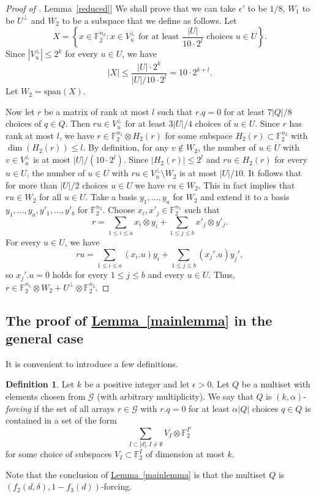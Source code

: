 \documentclass[11pt]{article}
\numberwithin{equation}{section}
\theoremstyle{definition}
\newtheorem{definition}[theorem]{Definition}
\theoremstyle{plain}
\newcommand{\expref}[2]{\hyperref[#2]{#1~\ref{#2}}}
\newcommand\eps{\epsilon}  %
\newcommand\F{\mathbb{F}}
\renewcommand\a{\alpha}
\renewcommand\d{\delta}
\newcommand \cG{\mathcal G}
\newcommand \s{\subset}
\begin{document}
\begin{proof}[Proof of \expref{Lemma}{reduced}]
  We shall prove that we can take $\eps'$ to be $1/8$, $W_1$ to be $U^{\perp}$ and $W_2$ to be a subspace that we define as follows. Let
  \[
    X=\left\{x\in \F_2^{n_2}: x\in V_u^{\perp} \text{ for at least } \frac{|U|}{10\cdot 2^{l}} \text{ choices } u\in U\right\}.
  \]
  Since $|V_u^{\perp}|\leq 2^k$ for every $u\in U$, we have
  \[
    |X|\leq \frac{|U|\cdot 2^k}{{|U|}/{10\cdot 2^l}}=10\cdot
    2^{k+l}.
  \]
  Let $W_2=\text{span}(X)$.
	
  Now let $r$ be a matrix of rank at most $l$ such that $r.q=0$ for at least $7|Q|/8$ choices of $q\in Q$. Then $ru\in V_u^{\perp}$ for at least $3|U|/4$ choices of $u\in U$. Since $r$ has rank at most $l$, we have $r\in \mathbb{F}_2^{n_1}\otimes H_2(r)$ for some subspace $H_2(r)\s \F_2^{n_2}$ with $\dim(H_2(r))\leq l$. By definition, for any $v\not \in W_2$, the number of $u\in U$ with $v\in V_u^{\perp}$ is at most ${|U|}/{(10\cdot 2^l)}$. Since $|H_2(r)|\leq 2^l$ and $ru\in H_2(r)$ for every $u\in U$, the number of $u\in U$ with $ru\in V_u^{\perp}\setminus W_2$ is at most ${|U|}/{10}$. It follows that for more than $|U|/2$ choices $u\in U$ we have $ru\in W_2$. This in fact implies that $ru\in W_2$ for all $u\in U$. Take a basis $y_1,\dots,y_a$ for $W_2$ and extend it to a basis $y_1,\dots,y_a,y'_1,\dots,y'_b$ for $\F_2^{n_2}$. Choose $x_i,x'_j\in \F_2^{n_1}$ such that
  \[
    r=\sum_{1\leq i\leq a} x_i\otimes y_i+\sum_{1\leq j\leq b} x'_j\otimes y'_j.
  \]
  For every $u\in U$, we have
  \[
    ru=\sum_{1\leq i\leq a} (x_i.u)y_i+\sum_{1\leq j\leq b}
    (x_j'.u)y_j',
  \]
  so $x_j'.u=0$ holds for every $1\leq j\leq b$ and every $u\in
  U$. Thus, $r\in \F_2^{n_1}\otimes W_2+U^{\perp}\otimes \F_2^{n_2}$.
\end{proof}

\subsection{The proof of \expref{Lemma}{mainlemma} in the general case}

It is convenient to introduce a few definitions.

\begin{definition}
  Let $k$ be a positive integer and let $\eps>0$. Let $Q$ be a multiset with elements chosen from $\cG$ (with arbitrary multiplicity). We say that $Q$ is $(k,\a)$-\emph{forcing} if the set of all arrays $r\in \cG$ with $r.q=0$ for at least $\a|Q|$ choices $q\in Q$ is contained in a set of the form
  \[
    \sum_{I\subset \lbrack d\rbrack,I\neq \emptyset} V_I\otimes \F_2^{I^c}
  \]
  for some choice of subspaces $V_I\s \F_2^{I}$ of dimension at most
  $k$.
\end{definition}
Note that the conclusion of \expref{Lemma}{mainlemma} is that the multiset $Q$ is $(f_2(d,\d),1-f_3(d))$-forcing.
\end{document}
